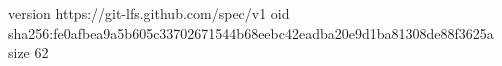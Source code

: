 version https://git-lfs.github.com/spec/v1
oid sha256:fe0afbea9a5b605c33702671544b68eebc42eadba20e9d1ba81308de88f3625a
size 62
